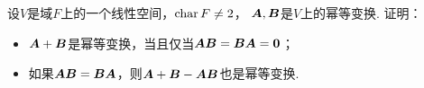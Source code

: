 \begin{example}
设\(V\)是域\(F\)上的一个线性空间，\(\FieldChar F \neq 2\)，
\(\vb{A},\vb{B}\)是\(V\)上的幂等变换.
证明：\begin{itemize}
	\item \(\vb{A}+\vb{B}\)是幂等变换，当且仅当\(\vb{A}\vb{B}=\vb{B}\vb{A}=\vb0\)；
	\item 如果\(\vb{A}\vb{B}=\vb{B}\vb{A}\)，则\(\vb{A}+\vb{B}-\vb{A}\vb{B}\)也是幂等变换.
\end{itemize}
\end{example}

